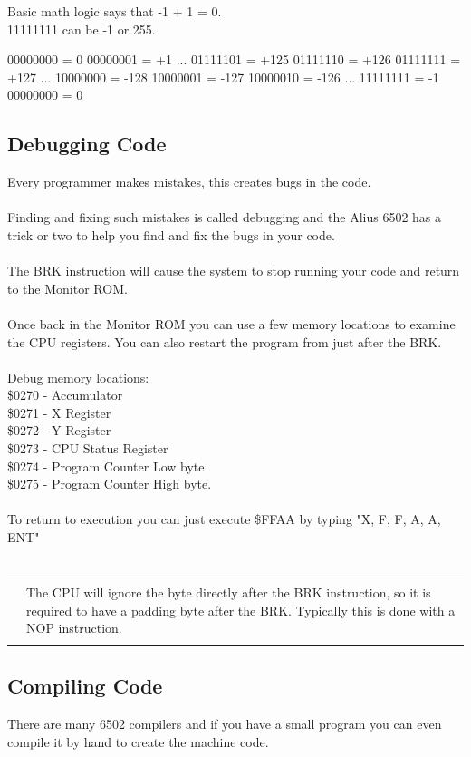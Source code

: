 \documentclass{ol-softwaremanual}
\newcommand{\Note}[1]{
\begin{table}[h]
\begin{tabular}{|p{0.1\textwidth}p{0.8\textwidth}|}
\hline
 & \\
\multicolumn{1}{|r}{\Huge\warning} & #1\\
 &  \\ \hline
\end{tabular}
\end{table}
}
\begin{document}
Basic math logic says that -1 + 1 = 0.\\
11111111 can be -1 or 255.\\

\begin{ffcode}
00000000 =  0
00000001 = +1
...
01111101 = +125
01111110 = +126
01111111 = +127
...
10000000 = -128
10000001 = -127
10000010 = -126
...
11111111 = -1
00000000 =  0
\end{ffcode}

\pagebreak

\subsection{Debugging Code}
Every programmer makes mistakes, this creates bugs in the code.\\
\\
Finding and fixing such mistakes is called debugging and the Alius 6502 has a trick or two to help you find and fix the bugs in your code.\\
\\
The BRK instruction will cause the system to stop running your code and return to the Monitor ROM.\\
\\
Once back in the Monitor ROM you can use a few memory locations to examine the CPU registers. You can also restart the program from just after the BRK.\\
\\
Debug memory locations:\\
\$0270 - Accumulator\\
\$0271 - X Register\\
\$0272 - Y Register\\
\$0273 - CPU Status Register\\
\$0274 - Program Counter Low byte\\
\$0275 - Program Counter High byte.\\
\\
To return to execution you can just execute \$FFAA by typing "X, F, F, A, A, ENT"\\
\\
\Note{The CPU will ignore the byte directly after the BRK instruction, so it is required to have a padding byte after the BRK. Typically this is done with a NOP instruction.}

\pagebreak

\subsection{Compiling Code}
There are many 6502 compilers and if you have a small program you can even compile it by hand to create the machine code.\\
\end{document}
